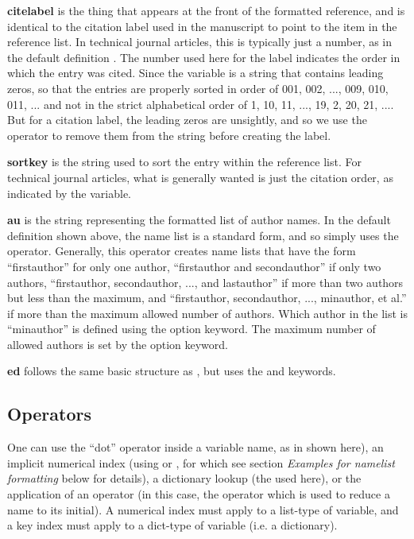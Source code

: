 \documentclass[letterpaper,10pt,english]{sphinxmanual}
\begin{document}
\textbf{citelabel} is the thing that appears at the front of the formatted reference, and is identical to the citation label used in the manuscript to point to the item in the reference list. In technical journal articles, this is typically just a number, as in the default definition . The number used here for the label indicates the order in which the entry was cited. Since the variable  is a string that contains leading zeros, so that the entries are properly sorted in order of 001, 002, ..., 009, 010, 011, ... and not in the strict alphabetical order of 1, 10, 11, ..., 19, 2, 20, 21, .... But for a citation label, the leading zeros are unsightly, and so we use the  operator to remove them from the string before creating the label.

\textbf{sortkey} is the string used to sort the entry within the reference list. For technical journal articles, what is generally wanted is just the citation order, as indicated by the  variable.

\textbf{au} is the string representing the formatted list of author names. In the default definition shown above, the name list is a standard form, and so simply uses the  operator. Generally, this operator creates name lists that have the form ``firstauthor'' for only one author, ``firstauthor and secondauthor'' if only two authors, ``firstauthor, secondauthor, ..., and lastauthor'' if more than two authors but less than the maximum, and ``firstauthor, secondauthor, ..., minauthor, et al.'' if more than the maximum allowed number of authors. Which author in the list is ``minauthor'' is defined using the  option keyword. The maximum number of allowed authors is set by the  option keyword.

\textbf{ed} follows the same basic structure as , but uses the  and  keywords.


\subsection{Operators}
\label{guidelines_for_writing_style_templates:operators}
One can use the ``dot'' operator inside a variable name, as in  shown here), an implicit numerical index (using  or , for which see section \emph{Examples for namelist formatting} below for details), a dictionary lookup (the  used here), or the application of an operator (in this case, the  operator which is used to reduce a name to its initial). A numerical index must apply to a list-type of variable, and a key index must apply to a dict-type of variable (i.e. a dictionary).
\end{document}
